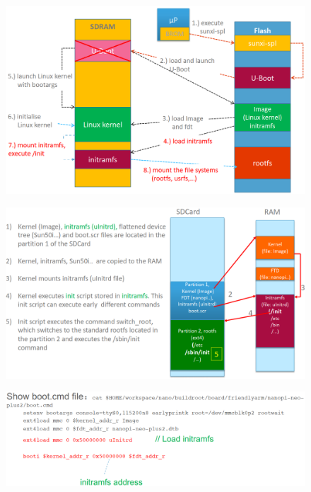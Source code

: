 \documentclass[resume]{subfiles}
\begin{document}
\begin{figure}[H]
    \centering
    \includegraphics[width=1\columnwidth]{Figures/fileSystem/initRamFsBootSeq.png}
    \label{fig:initRamFsBootSeq}
\end{figure}

\begin{figure}[H]
    \centering
    \includegraphics[width=1\columnwidth]{Figures/fileSystem/initRamFsBootSeq2.png}
    \label{fig:initRamFsBootSeq2}
\end{figure}

\begin{figure}[H]
    \centering
    \includegraphics[width=1\columnwidth]{Figures/fileSystem/initRamFsBootSeq3.png}
    \label{fig:initRamFsBootSeq3}
\end{figure}
\end{document}
